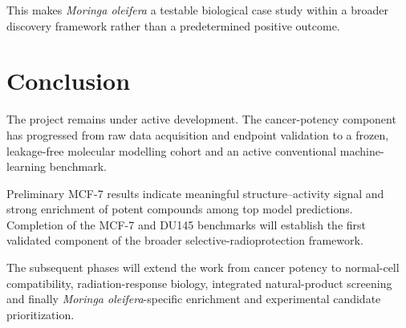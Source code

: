 \documentclass[11pt,a4paper]{article}
\begin{document}
This makes \textit{Moringa oleifera} a testable biological case study within a broader discovery framework rather than a predetermined positive outcome.

\section{Conclusion}

The project remains under active development. The cancer-potency component has progressed from raw data acquisition and endpoint validation to a frozen, leakage-free molecular modelling cohort and an active conventional machine-learning benchmark.

Preliminary MCF-7 results indicate meaningful structure--activity signal and strong enrichment of potent compounds among top model predictions. Completion of the MCF-7 and DU145 benchmarks will establish the first validated component of the broader selective-radioprotection framework.

The subsequent phases will extend the work from cancer potency to normal-cell compatibility, radiation-response biology, integrated natural-product screening and finally \textit{Moringa oleifera}-specific enrichment and experimental candidate prioritization.
\end{document}
